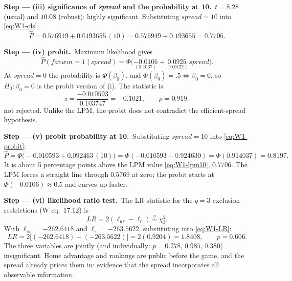 \documentclass[11pt,a4paper]{article}
\numberwithin{equation}{questao}   %
\newcommand{\passo}[2]{\par\smallskip\noindent\textbf{Step --- #1.}~#2}
\begin{document}
\begin{sol}
\passo{(iii) significance of \textit{spread} and the probability at 10}{$t=8.28$ (usual) and
$10.08$ (robust): highly significant. Substituting $\textit{spread}=10$ into \eqref{eq:W1-ols}:
\begin{equation}\label{eq:W1-lpm10}
\hat P=0.576949+0.0193655\,(10)=0.576949+0.193655=0.7706 .
\end{equation}}

\passo{(iv) probit}{Maximum likelihood gives
\begin{equation}\label{eq:W1-probit}
\hat P(\textit{favwin}=1\mid\textit{spread})=\Phi\big(\underset{(0.1037)}{-0.0106}+\underset{(0.0122)}{0.0925}\,\textit{spread}\big).
\end{equation}
At $\textit{spread}=0$ the probability is $\Phi(\beta_0)$, and $\Phi(\beta_0)=.5\iff\beta_0=0$, so
$H_0\colon\beta_0=0$ is the probit version of (i). The statistic is
\begin{equation}\label{eq:W1-z}
z=\frac{-0.010593}{0.103747}=-0.1021,\qquad p=0.919 :
\end{equation}
not rejected. Unlike the LPM, the probit does not contradict the efficient-spread hypothesis.}

\passo{(v) probit probability at 10}{Substituting $\textit{spread}=10$ into \eqref{eq:W1-probit}:
\begin{equation}\label{eq:W1-pr10}
\hat P=\Phi\big(-0.010593+0.092463\,(10)\big)=\Phi(-0.010593+0.924630)=\Phi(0.914037)=0.8197 .
\end{equation}
It is about 5 percentage points above the LPM value \eqref{eq:W1-lpm10}, $0.7706$. The LPM forces a
straight line through $0.5769$ at zero; the probit starts at $\Phi(-0.0106)\approx0.5$ and
curves up faster.}

\passo{(vi) likelihood ratio test}{The LR statistic for the $q=3$ exclusion restrictions (W eq.~17.12) is
\begin{equation}\label{eq:W1-LR}
LR=2(\ell_{ur}-\ell_r)\ \overset{a}{\sim}\ \chi^2_3 .
\end{equation}
With $\ell_{ur}=-262.6418$ and $\ell_r=-263.5622$, substituting into \eqref{eq:W1-LR}:
\begin{equation}\label{eq:W1-LRnum}
LR=2\big[(-262.6418)-(-263.5622)\big]=2(0.9204)=1.8408,\qquad p=0.606 .
\end{equation}
The three variables are jointly (and individually: $p=0.278$, $0.985$, $0.380$) insignificant.
Home advantage and rankings are public before the game, and the spread already prices them in:
evidence that the spread incorporates all observable information.}


\end{sol}
\end{document}
